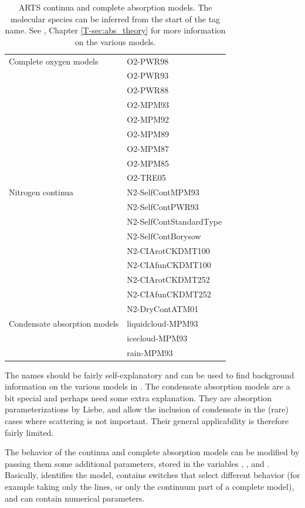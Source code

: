 \begin{table}
\begin{tabular}{ll}
Complete oxygen models & O2-PWR98 \\
& O2-PWR93 \\
& O2-PWR88 \\
& O2-MPM93 \\
& O2-MPM92 \\
& O2-MPM89 \\
& O2-MPM87 \\
& O2-MPM85 \\
& O2-TRE05 \\[1ex]

Nitrogen continua & N2-SelfContMPM93 \\
& N2-SelfContPWR93 \\
& N2-SelfContStandardType \\
& N2-SelfContBorysow \\
& N2-CIArotCKDMT100 \\
& N2-CIAfunCKDMT100 \\
& N2-CIArotCKDMT252 \\
& N2-CIAfunCKDMT252 \\
& N2-DryContATM01 \\[1ex]

Condensate absorption models & liquidcloud-MPM93 \\
& icecloud-MPM93 \\
& rain-MPM93 \\

\hline  
\end{tabular}
\caption{ARTS continua and complete absorption models. The molecular
  species can be inferred from the start of the tag name.  See
  \theory, Chapter \ref{T-sec:abs_theory} for more information on the
  various models.}
\label{tab:absorption:continua}
\end{table}

The names should be fairly self-explanatory and can be used to find
background information on the various models in \theory.  The
condensate absorption models are a bit special and perhaps need some
extra explanation. They are absorption parameterizations by Liebe, and
allow the inclusion of condensate in the (rare) cases where scattering
is not important. Their general applicability is therefore fairly limited.

The behavior of the continua and complete absorption models can be
modified by passing them some additional parameters, stored in the
variables , ,
and . Basically,
 identifies the model,
 contains switches that select different
behavior (for example taking only the lines, or only the continuum
part of a complete model), and  can
contain numerical parameters. 

